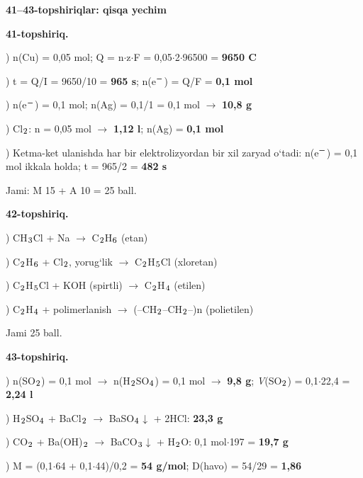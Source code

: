 \documentclass[11pt,a4paper]{article}
\renewcommand{\textsubscript}[1]{\ensuremath{_{\text{\fontsize{8}{8}\selectfont #1}}}}
\renewcommand{\textsuperscript}[1]{\ensuremath{^{\text{\fontsize{8}{8}\selectfont #1}}}}
\begin{document}
\noindent\textbf{41--43-topshiriqlar: qisqa yechim}\par\smallskip
\noindent\textbf{41-topshiriq.}\par
{}) n(Cu) = 0,05 mol; Q = n$\cdot$z$\cdot$F = 0,05$\cdot$2$\cdot$96500 = \textbf{9650 C}\par
{}) t = Q/I = 9650/10 = \textbf{965 s}; n(e\textsuperscript{$-$}) = Q/F = \textbf{0,1 mol}\par
{}) n(e\textsuperscript{$-$}) = 0,1 mol; n(Ag) = 0,1/1 = 0,1 mol $\to$ \textbf{10,8 g}\par
{}) Cl\textsubscript{2}: n = 0,05 mol $\to$ \textbf{1,12 l}; n(Ag) = \textbf{0,1 mol}\par
{}) Ketma-ket ulanishda har bir elektrolizyordan bir xil zaryad o`tadi: n(e\textsuperscript{$-$}) = 0,1 mol ikkala holda; t = 965/2 = \textbf{482 s}\par
\noindent Jami: M 15 + A 10 = 25 ball.\par
\noindent\textbf{42-topshiriq.}\par
{}) CH\textsubscript{3}Cl + Na $\to$ C\textsubscript{2}H\textsubscript{6} (etan)\par
{}) C\textsubscript{2}H\textsubscript{6} + Cl\textsubscript{2}, yorug`lik $\to$ C\textsubscript{2}H\textsubscript{5}Cl (xloretan)\par
{}) C\textsubscript{2}H\textsubscript{5}Cl + KOH (spirtli) $\to$ C\textsubscript{2}H\textsubscript{4} (etilen)\par
{}) C\textsubscript{2}H\textsubscript{4} + polimerlanish $\to$ (--CH\textsubscript{2}--CH\textsubscript{2}--)n (polietilen)\par
\noindent Jami 25 ball.\par
\noindent\textbf{43-topshiriq.}\par
{}) n(SO\textsubscript{2}) = 0,1 mol $\to$ n(H\textsubscript{2}SO\textsubscript{4}) = 0,1 mol $\to$ \textbf{9,8 g}; \textit{V}(SO\textsubscript{2}) = 0,1$\cdot$22,4 = \textbf{2,24 l}\par
{}) H\textsubscript{2}SO\textsubscript{4} + BaCl\textsubscript{2} $\to$ BaSO\textsubscript{4}$\downarrow$ + 2HCl: \textbf{23,3 g}\par
{}) CO\textsubscript{2} + Ba(OH)\textsubscript{2} $\to$ BaCO\textsubscript{3}$\downarrow$ + H\textsubscript{2}O: 0,1 mol$\cdot$197 = \textbf{19,7 g}\par
{}) M = (0,1$\cdot$64 + 0,1$\cdot$44)/0,2 = \textbf{54 g/mol}; D(havo) = 54/29 = \textbf{1,86}\par
\end{document}
